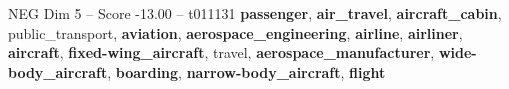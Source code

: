 \begin{textsample}{NEG Dim 5 – Score -13.00 – t011131}  \label{ex:f5_neg_027}
\textbf{passenger}, \textbf{air\_travel}, \textbf{aircraft\_cabin}, public\_transport, \textbf{aviation}, \textbf{aerospace\_engineering}, \textbf{airline}, \textbf{airliner}, \textbf{aircraft}, \textbf{fixed-wing\_aircraft}, travel, \textbf{aerospace\_manufacturer}, \textbf{wide-body\_aircraft}, \textbf{boarding}, \textbf{narrow-body\_aircraft}, \textbf{flight}

\end{textsample}
